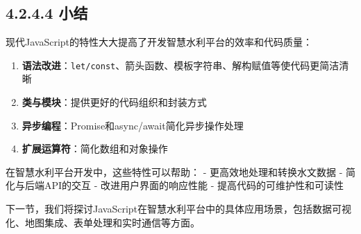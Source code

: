 \subsection{4.2.4.4 小结}\label{ux5c0fux7ed3}

现代JavaScript的特性大大提高了开发智慧水利平台的效率和代码质量：

\begin{enumerate}
\def\labelenumi{\arabic{enumi}.}
\tightlist
\item
  \textbf{语法改进}：\passthrough{\lstinline!let/const!}、箭头函数、模板字符串、解构赋值等使代码更简洁清晰
\item
  \textbf{类与模块}：提供更好的代码组织和封装方式
\item
  \textbf{异步编程}：Promise和async/await简化异步操作处理
\item
  \textbf{扩展运算符}：简化数组和对象操作
\end{enumerate}

在智慧水利平台开发中，这些特性可以帮助： - 更高效地处理和转换水文数据 -
简化与后端API的交互 - 改进用户界面的响应性能 -
提高代码的可维护性和可读性

下一节，我们将探讨JavaScript在智慧水利平台中的具体应用场景，包括数据可视化、地图集成、表单处理和实时通信等方面。
